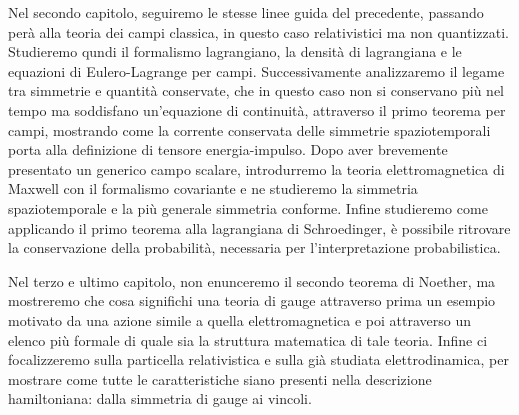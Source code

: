     Nel secondo capitolo, seguiremo le stesse linee guida del precedente, passando perà alla teoria dei campi classica, in questo caso relativistici ma non quantizzati. Studieremo qundi il formalismo lagrangiano, la densità di lagrangiana e le equazioni di Eulero-Lagrange per campi. Successivamente analizzaremo il legame tra simmetrie e quantità conservate, che in questo caso non si conservano più nel tempo ma soddisfano un'equazione di continuità, attraverso il primo teorema per campi, mostrando come la corrente conservata delle simmetrie spaziotemporali porta alla definizione di tensore energia-impulso. Dopo aver brevemente presentato un generico campo scalare, introdurremo la teoria elettromagnetica di Maxwell con il formalismo covariante e ne studieremo la simmetria spaziotemporale e la più generale simmetria conforme. Infine studieremo come applicando il primo teorema alla lagrangiana di Schroedinger, è possibile ritrovare la conservazione della probabilità, necessaria per l'interpretazione probabilistica.

    Nel terzo e ultimo capitolo, non enunceremo il secondo teorema di Noether, ma mostreremo che cosa significhi una teoria di gauge attraverso prima un esempio motivato da una azione simile a quella elettromagnetica e poi attraverso un elenco più formale di quale sia la struttura matematica di tale teoria. Infine ci focalizzeremo sulla particella relativistica e sulla già studiata elettrodinamica, per mostrare come tutte le caratteristiche siano presenti nella descrizione hamiltoniana: dalla simmetria di gauge ai vincoli. 